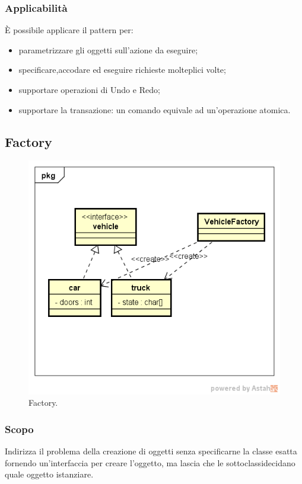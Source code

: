 \subsubsection{Applicabilità} È possibile applicare il pattern per:
\begin{itemize}
	\item parametrizzare gli oggetti sull'azione da eseguire;
	\item specificare,accodare ed eseguire richieste molteplici volte;
	\item supportare operazioni di Undo e Redo;
	\item supportare la transazione: un comando equivale ad un'operazione atomica.
\end{itemize}

\subsection{Factory}

\begin{figure}[H] \label{fig:factory}
	\includegraphics[scale=0.8]{img/factory2.png}
	\caption{Factory.}
\end{figure}

\subsubsection{Scopo} Indirizza il problema della creazione di oggetti senza specificarne la classe esatta fornendo un'interfaccia per creare l'oggetto, ma lascia che le sottoclassidecidano quale oggetto istanziare.

